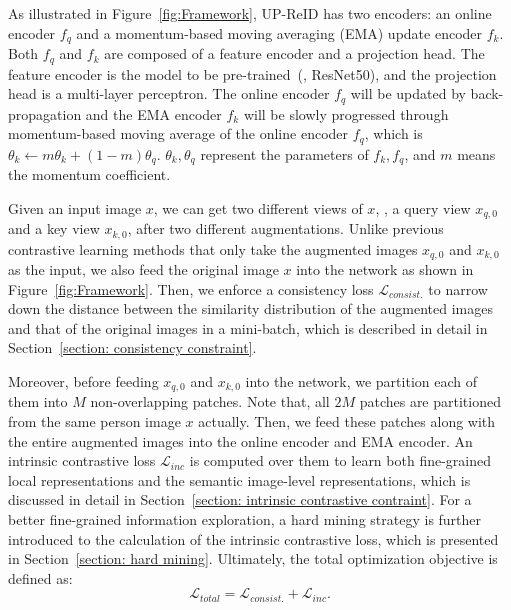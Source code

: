 \documentclass[10pt,twocolumn,letterpaper]{article}
\begin{document}
As illustrated in Figure~\ref{fig:Framework}, UP-ReID has two encoders: an online encoder $f_q$ and a momentum-based moving averaging (EMA) update encoder $f_k$. Both $f_q$ and $f_k$ are composed of a feature encoder and a projection head. The feature encoder is the model to be pre-trained~(\eg, ResNet50), and the projection head is a multi-layer perceptron. The online encoder $f_q$ will be updated by back-propagation and the EMA encoder $f_k$ will be slowly progressed through momentum-based moving average of the online encoder $f_q$, which is $\theta_k \gets m\theta_k + (1-m) \theta_q$. $\theta_k, \theta_q$ represent the parameters of $f_k, f_q$, and $m$ means the momentum coefficient.




Given an input image $x$, we can get two different views of $x$, \ie, a query view ${x}_{q,0}$ and a key view ${x}_{k,0}$, after two different augmentations. 
Unlike previous contrastive learning methods that only take the augmented images ${x}_{q,0}$ and ${x}_{k,0}$ as the input, we also feed the original image $x$ into the network as shown in Figure~\ref{fig:Framework}. Then, we enforce a consistency loss $\mathcal{L}_{consist.}$ to narrow down the distance between the similarity distribution of the augmented images and that of the original images in a mini-batch, which is described in detail in Section~\ref{section: consistency constraint}.

Moreover, before feeding ${x}_{q,0}$ and ${x}_{k,0}$ into the network, we partition each of them into $M$ non-overlapping patches. Note that, all $2M$ patches are partitioned from the same person image $x$ actually. Then, we feed these patches along with the entire augmented images into the online encoder and EMA encoder. An intrinsic contrastive loss $\mathcal{L}_{inc}$ is computed over them to learn both fine-grained local representations and the semantic image-level representations, which is discussed in detail in Section~\ref{section: intrinsic contrastive contraint}. For a better fine-grained information exploration, a hard mining strategy is further introduced to the calculation of the intrinsic contrastive loss, which is presented in Section~\ref{section: hard mining}. Ultimately, the total optimization objective is defined as:
\begin{equation}
\label{total loss}
    \mathcal{L}_{total} = \mathcal{L}_{consist.} + \mathcal{L}_{inc}.
\end{equation}
\end{document}
